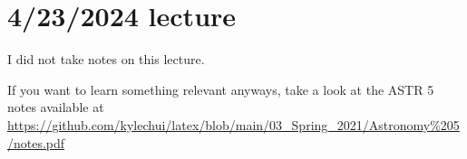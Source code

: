 \documentclass[class=article, crop=false]{standalone}
\begin{document}
\section{4/23/2024 lecture}
I did not take notes on this lecture.
\par
If you want to learn something relevant anyways, take a look at the ASTR 5 notes available at \url{https://github.com/kylechui/latex/blob/main/03_Spring_2021/Astronomy%205/notes.pdf}
\end{document}
